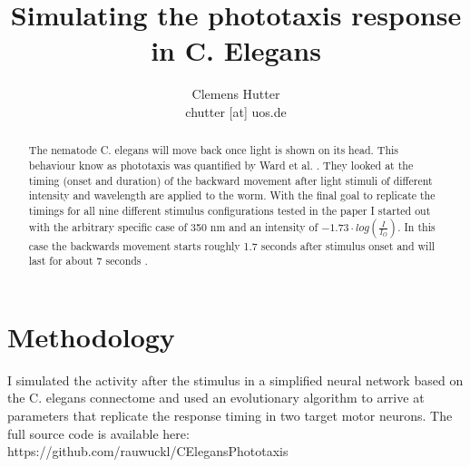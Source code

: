 \usepackage{amsmath}
\usepackage{amsfonts}
\usepackage{amssymb}
\usepackage{esvect}
\usepackage{graphicx}
\usepackage{float}


\usepackage[a4paper]{geometry}

\usepackage{enumitem}

\parindent 0pt
\parskip 8pt

\usepackage{csquotes}
\usepackage{hyperref}
\title{Simulating the phototaxis response in C. Elegans}
\author{Clemens Hutter \\ chutter [at] uos.de}







\maketitle
\begin{abstract}
The nematode C. elegans will move back once light is shown on its head. This behaviour know as phototaxis was quantified by Ward et al. \cite{Ward2008}. They looked at the timing (onset and duration) of the backward movement after light stimuli of different intensity and wavelength are applied to the worm. With the final goal to replicate the timings for all nine different stimulus configurations tested in the paper I started out with the arbitrary specific case of 350 nm and an intensity of $-1.73 \cdot log(\frac{I}{I_O})$. 
In this case the backwards movement starts roughly 1.7 seconds after stimulus onset and will last for about 7 seconds \cite{Ward2008}.
\end{abstract}

\section{Methodology} %
\label{sec:methodolegy}
I simulated the activity after the stimulus in a simplified neural network \cite{Appiah} based on the C. elegans connectome and used an evolutionary algorithm to arrive at parameters that replicate the response timing in two target motor neurons. The full source code is available here: https://github.com/rauwuckl/CElegansPhototaxis

